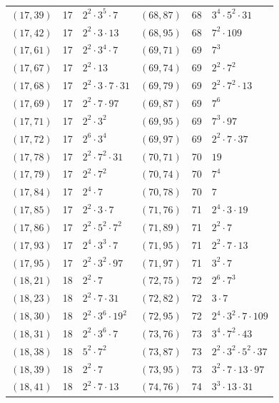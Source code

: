 \documentclass[11pt]{article}
\begin{document}
\begin{longtable}{@{}lrl@{\qquad}lrl@{}}
$(17,39)$ & 17 & $2^{2}\cdot 3^{5}\cdot 7$ & $(68,87)$ & 68 & $3^{4}\cdot 5^{2}\cdot 31$\\
$(17,42)$ & 17 & $2^{2}\cdot 3\cdot 13$ & $(68,95)$ & 68 & $7^{2}\cdot 109$\\
$(17,61)$ & 17 & $2^{2}\cdot 3^{4}\cdot 7$ & $(69,71)$ & 69 & $7^{3}$\\
$(17,67)$ & 17 & $2^{2}\cdot 13$ & $(69,74)$ & 69 & $2^{2}\cdot 7^{2}$\\
$(17,68)$ & 17 & $2^{2}\cdot 3\cdot 7\cdot 31$ & $(69,79)$ & 69 & $2^{2}\cdot 7^{2}\cdot 13$\\
$(17,69)$ & 17 & $2^{2}\cdot 7\cdot 97$ & $(69,87)$ & 69 & $7^{6}$\\
$(17,71)$ & 17 & $2^{2}\cdot 3^{2}$ & $(69,95)$ & 69 & $7^{3}\cdot 97$\\
$(17,72)$ & 17 & $2^{6}\cdot 3^{4}$ & $(69,97)$ & 69 & $2^{2}\cdot 7\cdot 37$\\
$(17,78)$ & 17 & $2^{2}\cdot 7^{2}\cdot 31$ & $(70,71)$ & 70 & $19$\\
$(17,79)$ & 17 & $2^{2}\cdot 7^{2}$ & $(70,74)$ & 70 & $7^{4}$\\
$(17,84)$ & 17 & $2^{4}\cdot 7$ & $(70,78)$ & 70 & $7$\\
$(17,85)$ & 17 & $2^{2}\cdot 3\cdot 7$ & $(71,76)$ & 71 & $2^{4}\cdot 3\cdot 19$\\
$(17,86)$ & 17 & $2^{2}\cdot 5^{2}\cdot 7^{2}$ & $(71,89)$ & 71 & $2^{2}\cdot 7$\\
$(17,93)$ & 17 & $2^{4}\cdot 3^{3}\cdot 7$ & $(71,95)$ & 71 & $2^{2}\cdot 7\cdot 13$\\
$(17,95)$ & 17 & $2^{2}\cdot 3^{2}\cdot 97$ & $(71,97)$ & 71 & $3^{2}\cdot 7$\\
$(18,21)$ & 18 & $2^{2}\cdot 7$ & $(72,75)$ & 72 & $2^{6}\cdot 7^{3}$\\
$(18,23)$ & 18 & $2^{2}\cdot 7\cdot 31$ & $(72,82)$ & 72 & $3\cdot 7$\\
$(18,30)$ & 18 & $2^{2}\cdot 3^{6}\cdot 19^{2}$ & $(72,95)$ & 72 & $2^{4}\cdot 3^{2}\cdot 7\cdot 109$\\
$(18,31)$ & 18 & $2^{2}\cdot 3^{6}\cdot 7$ & $(73,76)$ & 73 & $3^{4}\cdot 7^{2}\cdot 43$\\
$(18,38)$ & 18 & $5^{2}\cdot 7^{2}$ & $(73,87)$ & 73 & $2^{2}\cdot 3^{2}\cdot 5^{2}\cdot 37$\\
$(18,39)$ & 18 & $2^{2}\cdot 7$ & $(73,95)$ & 73 & $3^{2}\cdot 7\cdot 13\cdot 97$\\
$(18,41)$ & 18 & $2^{2}\cdot 7\cdot 13$ & $(74,76)$ & 74 & $3^{3}\cdot 13\cdot 31$\\

\end{longtable}
\end{document}
